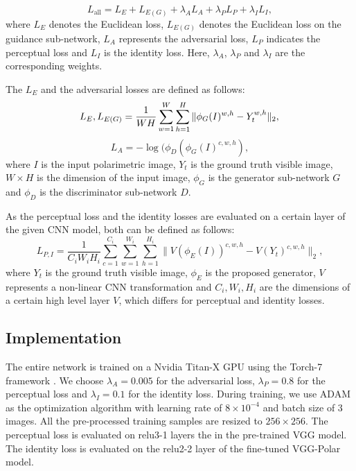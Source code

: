 \documentclass[10pt,twocolumn,letterpaper]{article}
\begin{document}
\begin{equation}
\label{eq:overall_loss}
L_{\text{all}} = L_{E} + L_{E(G)}+ \lambda_A L_{A} + \lambda_PL_{P} +\lambda_IL_{I} ,
\end{equation}
where $L_{E}$ denotes the Euclidean  loss, $L_{E(G)}$ denotes the Euclidean  loss on the guidance sub-network, $L_A$ represents the adversarial loss, $L_P$ indicates the perceptual loss and $L_I$ is the identity loss. Here, $\lambda_A$, $\lambda_P$ and $\lambda_I$ are the corresponding weights. 

The $L_E$ and the adversarial losses are defined as follows:
\begin{equation}
\label{eq:trans_loss_euc}
 L_{E}, L_{E(G)}= \frac{1}{WH}\sum_{w=1}^{W}\sum_{h=1}^{H} \|\phi_{G}({I})^{w,h}-Y_t^{w,h}\|_2,	\\
 \end{equation} 
 \begin{equation}
 \label{eq:trans_loss_adv}
   L_A= -\log(\phi_D(\phi_G({I})^{c,w,h}),
 \end{equation}
 where $I$ is the input polarimetric image, $Y_t$ is the ground truth visible image, $W\times H$ is the dimension of the input image, $\phi_{G}$ is the generator sub-network $G$ and $\phi_D$ is the discriminator sub-network $D$.

As the perceptual loss and the identity losses are evaluated on a certain layer of the given CNN model, both can be defined as follows:  
\begin{equation}
\label{eq:dehaze_loss_perc}
 L_{P,I}= \frac{1}{C_iW_iH_i}\sum_{c=1}^{C_i}\sum_{w=1}^{W_i}\sum_{h=1}^{H_i} \|V(\phi_E({I}))^{c,w,h}-V
 (Y_t)^{c,w,h}\|_2,
\end{equation}
 where $Y_t$ is the ground truth visible image, $\phi_{E}$ is the proposed generator, $V$ represents a non-linear CNN transformation and $C_i,W_i,H_i$ are the dimensions of a certain high level layer $V$, which differs for perceptual and identity losses.   
 
 
\subsection{Implementation}
The entire network is trained on a Nvidia Titan-X  GPU using the Torch-7 framework \cite{torch}. We choose $\lambda_A=0.005$ for the adversarial loss,  $\lambda_P=0.8$  for the perceptual loss and  $\lambda_I=0.1$ for the identity loss. During training, we use ADAM \cite{adam_opt} as the optimization algorithm with learning rate  of $8\times 10^{-4}$ and batch size of  3 images.  All the pre-processed training samples are resized to $256\times 256$. The perceptual loss is evaluated on relu3-1 layers the in the pre-trained VGG \cite{vggface} model.  The identity loss is evaluated on the relu2-2 layer of the fine-tuned VGG-Polar model.  
\end{document}
